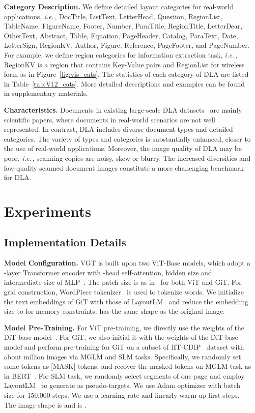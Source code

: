 \documentclass[10pt,twocolumn,letterpaper]{article}
\def\ie{\emph{i.e.}\,}
\begin{document}
\noindent
\textbf{Category Description.}
We define detailed  layout categories for real-world applications, 
\ie, DocTitle, ListText, LetterHead, Question, RegionList, TableName, FigureName, Footer, Number,
ParaTitle, RegionTitle, LetterDear, OtherText, Abstract, Table, Equation, PageHeader, Catalog, ParaText, Date, LetterSign, RegionKV, Author, Figure, Reference, PageFooter, and PageNumber.
For example, we define  region categories for information extraction task, \ie,
RegionKV is a region that contains Key-Value pairs and RegionList for wireless form as in Figure~\ref{fig:vis_cats}.
The statistics of each category of DLA are listed in Table~\ref{tab:V12_cats}.
More detailed descriptions and examples can be found in supplementary materials.

\noindent
\textbf{Characteristics.}
Documents in existing large-scale DLA datasets~\cite{zhong2019publaynet,li2020docbank} are mainly scientific papers, where documents in real-world scenarios are not well represented.
In contrast, DLA includes  diverse document types and  detailed categories.
The variety of types and categories is substantially enhanced, closer to the use of real-world applications.
Moreover, the image quality of DLA  may be poor, \ie, scanning copies are noisy, skew or blurry.
The increased diversities and low-quality scanned document images constitute a more challenging benchmark for DLA.




\section{Experiments}
\subsection{Implementation Details}
\noindent
\textbf{Model Configuration.}  
VGT is built upon two ViT-Base models, which adopt a -layer Transformer encoder 
with -head self-attention,  hidden size and  intermediate size of MLP~\cite{vit}.
The patch size  is  as in~\cite{vit} for both ViT and GiT.
For grid construction, WordPiece tokenizer~\cite{devlin2018bert} is used to tokenize words.
We initialize the text embeddings of GiT with those of LayoutLM~\cite{xu2020layoutlm}
and reduce the embedding size  to  for memory constraints.
 has the same shape as the original image.


\noindent
\textbf{Model Pre-Training.} 
For ViT pre-training, we directly use the weights of the DiT-base model~\cite{li2022dit}.
For GiT, we also initial it with the weights of the DiT-base model and perform pre-training for GiT on a subset of IIT-CDIP~\cite{iit} dataset with about  million images via MGLM and SLM tasks.
Specifically, we randomly set some tokens as [MASK] tokens, and recover the masked tokens on MGLM task as in BERT~\cite{devlin2018bert}.
For SLM task, we randomly select  segments of one page
and employ LayoutLM~\cite{xu2020layoutlm} to generate  as pseudo-targets.
We use Adam optimizer with  batch size for 150,000 steps.
We use a learning rate  and linearly warm up  first steps.
The image shape is  and  is .
\end{document}
